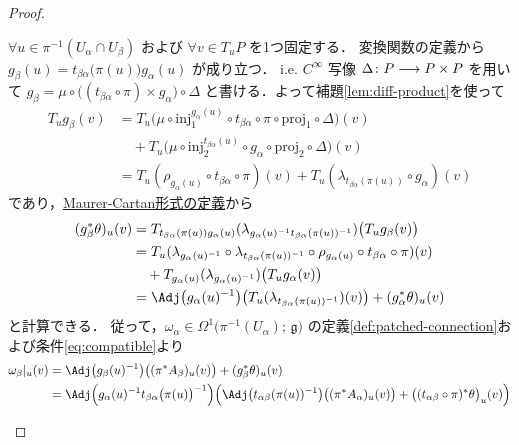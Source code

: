 \documentclass[TQFT_main]{subfiles}
\begin{document}
\begin{proof}
\begin{enumerate}
\begin{description}
            $\forall u \in \pi^{-1}(U_\alpha \cap U_\beta)$ および $\forall v \in T_u P$ を1つ固定する．
            変換関数の定義から $g_\beta(u) = t_{\beta\alpha} \bigl( \pi(u) \bigr) g_\alpha(u)$ が成り立つ．
            i.e. $C^\infty$ 写像 $\Delta \colon P \longrightarrow P \times P$ を用いて $g_\beta = \mu \circ \bigl( (t_{\beta\alpha} \circ \pi) \times g_\alpha \bigr) \circ \Delta$ と書ける．よって補題\ref{lem:diff-product}を使って
            \begin{align}
                T_u g_\beta (v) 
                &= T_u \bigl( \mu \circ \mathrm{inj}_1^{g_\alpha(u)} \circ t_{\beta\alpha} \circ \pi \circ \mathrm{proj}_1 \circ \Delta \bigr) (v) \\
                &\quad + T_u \bigl( \mu \circ \mathrm{inj}_2^{t_{\beta\alpha}(u)} \circ g_\alpha \circ \mathrm{proj}_2 \circ \Delta \bigr) (v) \\
                &= T_u (\rho_{g_\alpha(u)} \circ t_{\beta\alpha} \circ \pi)(v) + T_u(\lambda_{t_{\beta\alpha}(\pi(u))} \circ g_\alpha)(v)
            \end{align}
            であり，\hyperref[def:Maurer-Cartan]{Maurer-Cartan形式の定義}から
            \begin{align}
                (g_\beta^* \theta)_u(v)
                &= T_{t_{\beta\alpha}(\pi(u)) g_\alpha(u)} (\lambda_{g_\alpha(u)^{-1} t_{\beta\alpha}(\pi(u))^{-1}}) \bigl( T_u g_\beta(v) \bigr)  \\
                &= T_u (\lambda_{g_\alpha(u)^{-1}} \circ \lambda_{t_{\beta\alpha}(\pi(u))^{-1}} \circ \rho_{g_\alpha(u)} \circ t_{\beta\alpha} \circ \pi)(v) \\
                &\quad + T_{g_\alpha(u)} (\lambda_{g_\alpha(u)^{-1}}) \bigl( T_u g_\alpha (v) \bigr) \\
                &= \Adj \bigl(g_\alpha(u)^{-1}\bigr) \bigl( T_u(\lambda_{t_{\beta\alpha}(\pi(u))^{-1}})(v) \bigr) + (g_\alpha^* \theta)_u (v)
            \end{align}
            と計算できる．
            従って，$\omega_\alpha \in \Omega^1\bigl(\pi^{-1}(U_\alpha);\, \mathfrak{g}\bigr)$ の定義\eqref{def:patched-connection}および条件\eqref{eq:compatible}より
            \begin{align}
                \omega_\beta|_u (v)
                &= \Adj \bigl( g_\beta(u)^{-1} \bigr) \bigl( (\pi^* A_\beta)_u(v) \bigr) + (g_\beta^* \theta)_u(v) \\
                &= \Adj \Bigl( g_\alpha(u)^{-1} t_{\beta\alpha}\bigl(\pi(u)\bigr)^{-1} \Bigr) \Bigl( \Adj \bigl( t_{\alpha\beta}(\pi(u))^{-1} \bigr) \bigl( (\pi^* A_\alpha)_u(v) \bigr) + \bigl((t_{\alpha\beta} \circ \pi)^* \theta\bigr)_u(v)  \Bigr) \\

\end{align}
\end{description}
\end{enumerate}
\end{proof}
\end{document}
